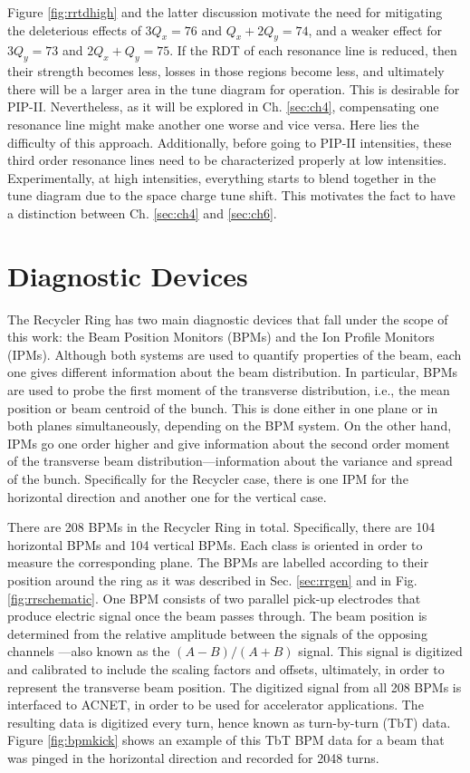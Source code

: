 Figure \ref{fig:rrtdhigh} and the latter discussion motivate the need for mitigating the deleterious effects of $3 Q_x=76$ and $Q_x+2Q_y=74$, and a weaker effect for $3 Q_y=73$ and $2 Q_x+Q_y=75$. If the RDT of each resonance line is reduced, then their strength becomes less, losses in those regions become less, and ultimately there will be a larger area in the tune diagram for operation. This is desirable for PIP-II. Nevertheless, as it will be explored in Ch. \ref{sec:ch4}, compensating one resonance line might make another one worse and vice versa. Here lies the difficulty of this approach. Additionally, before going to PIP-II intensities, these third order resonance lines need to be characterized properly at low intensities. Experimentally, at high intensities, everything starts to blend together in the tune diagram due to the space charge tune shift. This motivates the fact to have a distinction between Ch. \ref{sec:ch4} and \ref{sec:ch6}.    

\section{\label{sec:diagnostic}Diagnostic Devices}

The Recycler Ring has two main diagnostic devices that fall under the scope of this work: the Beam Position Monitors (BPMs) and the Ion Profile Monitors (IPMs). Although both systems are used to quantify properties of the beam, each one gives different information about the beam distribution. In particular, BPMs are used to probe the first moment of the transverse distribution, i.e., the mean position or beam centroid of the bunch. This is done either in one plane or in both planes simultaneously, depending on the BPM system. On the other hand, IPMs go one order higher and give information about the second order moment of the transverse beam distribution---information about the variance and spread of the bunch. Specifically for the Recycler case, there is one IPM for the horizontal direction and another one for the vertical case.

There are 208 BPMs in the Recycler Ring in total. Specifically, there are 104 horizontal BPMs and 104 vertical BPMs. Each class is oriented in order to measure the corresponding plane. The BPMs are labelled according to their position around the ring as it was described in Sec. \ref{sec:rrgen} and in Fig. \ref{fig:rrschematic}. One BPM consists of two parallel pick-up electrodes that produce electric signal once the beam passes through. The beam position is determined from the relative amplitude between the signals of the opposing channels \cite{rrbpms}---also known as the $(A-B)/(A+B)$ signal. This signal is digitized and calibrated to include the scaling factors and offsets, ultimately, in order to represent the transverse beam position. The digitized signal from all 208 BPMs is interfaced to ACNET, in order to be used for accelerator applications. The resulting data is digitized every turn, hence known as turn-by-turn (TbT) data. Figure \ref{fig:bpmkick} shows an example of this TbT BPM data for a beam that was pinged in the horizontal direction and recorded for 2048 turns.      

